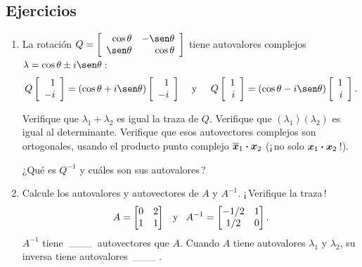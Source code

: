\documentclass[12pt,a4paper]{article}
\newcommand{\bi}[1]{\hbox{\boldmath$#1$}}
\newcommand\1{\mbox{\,\vrule height-0.8pt depth1.0pt width2pc\,}}
\newcommand\2{\mbox{\,\vrule height-0.8pt depth1.0pt width1pc\,}}
\newcommand\bfcdot{\boldsymbol{\cdot}}
\newcommand\og{\quad\hbox{y}\quad}
\newcommand{\la}{\lambda}
\begin{document}
\subsection*{Ejercicios}

\begin{enumerate}
    \item La rotación $Q=\left[\begin{array}{rr}
\cos\theta&-\sen\theta\\
\sen\theta&\cos\theta
\end{array}\right]$ tiene autovalores complejos $\lambda=\cos\theta\pm i\sen\theta$\,:
 $$Q\left[\begin{array}{r}1\\-i\end{array}\right]=(\cos\theta+i\sen\theta)\left[\begin{array}{r}1\\-i\end{array}\right]
 \quad\text{ y\; }\quad
 Q\left[\begin{array}{r}1\\i\end{array}\right]=(\cos\theta-i\sen\theta)\left[\begin{array}{r}1\\i\end{array}\right].$$

\noindent
Verifique que $\lambda_1+\lambda_2$ es igual la traza de $Q$. Verifique que $(\lambda_1)(\lambda_2)$ es igual al determinante. Verifique que esos autovectores complejos son ortogonales, usando el producto punto complejo $\bi{\overline{x}}_1\bfcdot\bi{x}_2$ (¡\,no solo $\bi{x}_1\bfcdot\bi{x}_2$\,!).

¿Qué es $Q^{-1}$ y cuáles son sus autovalores\,?
\item Calcule los autovalores y autovectores de $A$ y   $A^{-1}$. ¡\,Verifique la traza\,!
%
\[
A=\begin{bmatrix}
                 0 & 2 \\
                 1 & 1 \end{bmatrix} \og
A^{-1}=
\begin{bmatrix}
            -1/2  & 1 \\
             1/2  & 0\end{bmatrix}.
\]
%
$A^{-1}$ tiene $\1$ autovectores que $A$.  Cuando $A$ tiene autovalores $\la_1$ y $\la_2$, su inversa tiene autovalores $\1$.


\end{enumerate}
\end{document}
